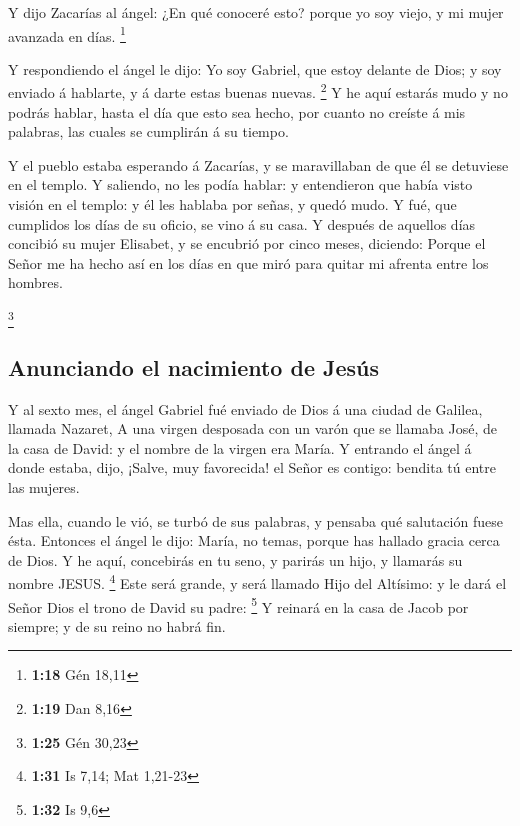  Y dijo Zacarías al ángel: ¿En qué conoceré esto? porque
yo soy viejo, y mi mujer avanzada en días. \footnote{\textbf{1:18} Gén
  18,11}

 Y respondiendo el ángel le dijo: Yo soy Gabriel, que
estoy delante de Dios; y soy enviado á hablarte, y á darte estas buenas
nuevas. \footnote{\textbf{1:19} Dan 8,16}  Y he aquí
estarás mudo y no podrás hablar, hasta el día que esto sea hecho, por
cuanto no creíste á mis palabras, las cuales se cumplirán á su tiempo.

 Y el pueblo estaba esperando á Zacarías, y se
maravillaban de que él se detuviese en el templo.  Y
saliendo, no les podía hablar: y entendieron que había visto visión en
el templo: y él les hablaba por señas, y quedó mudo.  Y
fué, que cumplidos los días de su oficio, se vino á su casa.
 Y después de aquellos días concibió su mujer Elisabet, y
se encubrió por cinco meses, diciendo:  Porque el Señor
me ha hecho así en los días en que miró para quitar mi afrenta entre los
hombres.

\footnote{\textbf{1:25} Gén 30,23}

\hypertarget{anunciando-el-nacimiento-de-jesuxfas}{%
\subsection{Anunciando el nacimiento de
Jesús}\label{anunciando-el-nacimiento-de-jesuxfas}}

 Y al sexto mes, el ángel Gabriel fué enviado de Dios á
una ciudad de Galilea, llamada Nazaret,  A una virgen
desposada con un varón que se llamaba José, de la casa de David: y el
nombre de la virgen era María.  Y entrando el ángel á
donde estaba, dijo, ¡Salve, muy favorecida! el Señor es contigo: bendita
tú entre las mujeres.

 Mas ella, cuando le vió, se turbó de sus palabras, y
pensaba qué salutación fuese ésta.  Entonces el ángel le
dijo: María, no temas, porque has hallado gracia cerca de Dios.
 Y he aquí, concebirás en tu seno, y parirás un hijo, y
llamarás su nombre JESUS. \footnote{\textbf{1:31} Is 7,14; Mat 1,21-23}
 Este será grande, y será llamado Hijo del Altísimo: y le
dará el Señor Dios el trono de David su padre: \footnote{\textbf{1:32}
  Is 9,6}  Y reinará en la casa de Jacob por siempre; y
de su reino no habrá fin.

